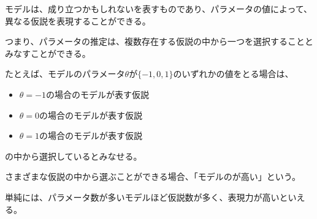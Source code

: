 \documentclass[../../../topic_machine-learning]{subfiles}
\begin{document}
モデルは、成り立つかもしれないを表すものであり、パラメータの値によって、異なる仮説を表現することができる。

つまり、パラメータの推定は、複数存在する仮説の中から一つを選択することとみなすことができる。

\br

たとえば、モデルのパラメータ$\theta$が$\{ -1, 0, 1 \}$のいずれかの値をとる場合は、
\begin{itemize}
  \item $\theta = -1$の場合のモデルが表す仮説
  \item $\theta = 0$の場合のモデルが表す仮説
  \item $\theta = 1$の場合のモデルが表す仮説
\end{itemize}
の中から選択しているとみなせる。

\br

さまざまな仮説の中から選ぶことができる場合、「モデルのが高い」という。

単純には、パラメータ数が多いモデルほど仮説数が多く、表現力が高いといえる。
\end{document}
